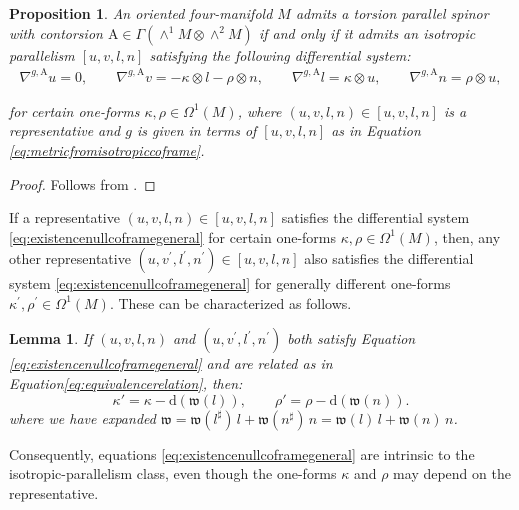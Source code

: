 \documentclass[10pt,reqno,a4paper]{amsart}
\theoremstyle{plain}
\newtheorem{prop}[thm]{Proposition}
\newtheorem{lemma}[thm]{Lemma}
\theoremstyle{definition}
\theoremstyle{remark}
\theoremstyle{remark}
\def\mA{\mathrm{A}}
\def\dd{\mathrm{d}}
\def\frw{\mathfrak{w}}
\renewcommand{\(}{ (}
\renewcommand{\)}{ )}
\begin{document}
\begin{prop}
\label{prop:existencenullcoframegeneral}
An oriented four-manifold $M$ admits a torsion parallel spinor with contorsion $\mA \in \Gamma(\wedge^1 M \otimes \wedge^2 M)$ if and only if it admits an isotropic parallelism $[u,v,l,n]$ satisfying the following differential system:
\begin{eqnarray}
\label{eq:existencenullcoframegeneral}
\nabla^{g,\mA} u =0, \qquad  \nabla^{g,\mA} v =-\kappa\otimes l-\rho\otimes n,\qquad \nabla^{g,\mA} l =\kappa\otimes u, \qquad  \nabla^{g,\mA} n =\rho\otimes u ,
\end{eqnarray}

\noindent
for certain one-forms $\kappa,\rho\in\Omega^1(M)$, where $(u,v,l,n)\in [u,v,l,n]$ is a representative and $g$ is given in terms of $[u,v,l,n]$ as in Equation \eqref{eq:metricfromisotropiccoframe}. 
\end{prop}
 
\begin{proof}
Follows from \cite[Lemma~4.24, Theorem~4.26 and Remark~4.27]{Cortes:2019xmk}.
\end{proof}

\noindent
If a representative $(u,v,l,n) \in [u,v,l,n]$ satisfies the differential system \eqref{eq:existencenullcoframegeneral} for certain one-forms $\kappa,\rho \in \Omega^1(M)$, then, any other representative $(u,v^{\prime},l^{\prime},n^{\prime})\in [u,v,l,n]$ also satisfies the differential system \eqref{eq:existencenullcoframegeneral} for generally different one-forms $\kappa^{\prime},\rho^{\prime} \in \Omega^1(M)$. These can be characterized as follows.
 
\begin{lemma} 
If $(u,v,l,n)$ and $(u,v^{\prime},l^{\prime},n^{\prime})$ both satisfy Equation \eqref{eq:existencenullcoframegeneral} and are related as in Equation\eqref{eq:equivalencerelation}, then:
\begin{equation}
\label{eq:kapparhogauge}
\kappa'=\kappa-\dd (\frw(l)) ,\qquad \rho'=\rho-\dd (\frw(n)).
\end{equation}
where we have expanded $\frw = \frw(l^{\sharp})\, l + \frw(n^{\sharp})\, n = \frw(l)\, l + \frw(n)\, n $.
\end{lemma}

\noindent
Consequently, equations \eqref{eq:existencenullcoframegeneral} are intrinsic to the isotropic-parallelism class, even though the one-forms $\kappa$ and $\rho$ may depend on the representative. 
\end{document}
